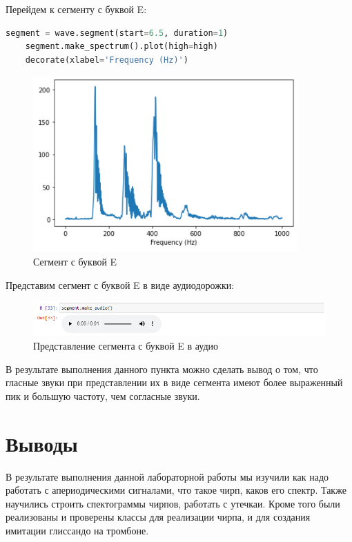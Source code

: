 \documentclass[a4paper]{article}
\begin{document}
             Перейдем к сегменту с буквой E:
            
\begin{lstlisting}[language=Python, caption= Сегмент с буквой E]
    segment = wave.segment(start=6.5, duration=1)
    segment.make_spectrum().plot(high=high)
    decorate(xlabel='Frequency (Hz)')
\end{lstlisting}   
            
             \begin{figure}[H]
                \centering
                \includegraphics{ex_6_letter_e_segment.png}
                \caption{Сегмент с буквой E}
                \label{fig:ex_6_letter_e_segment}
            \end{figure}
            
            Представим сегмент с буквой E в виде аудиодорожки:
            
            \begin{figure}[H]
                \centering
                \includegraphics[width=\textwidth]{ex_6_letter_e_audio.png}
                \caption{Представление сегмента с буквой E в аудио}
                \label{fig:ex_6_letter_e_audio}
            \end{figure}
            
            В результате выполнения данного пункта можно сделать вывод о том, что гласные звуки при представлении их в виде сегмента имеют более выраженный пик и большую частоту, чем согласные звуки. 
            
    \newpage
        \section{Выводы}
             В результате выполнения данной лабораторной работы мы изучили как надо работать с апериодическими сигналами, что такое чирп, каков его спектр. Также научились строить спектограммы чирпов, работать с утечкаи. Кроме того были реализованы и проверены классы для реализации чирпа, и для создания имитации глиссандо на тромбоне. 
           
\end{document}
